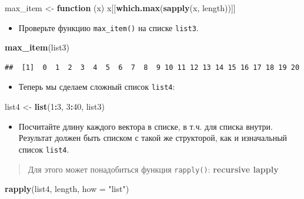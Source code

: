 \documentclass[]{book}
\newenvironment{Shaded}{\begin{snugshade}}{\end{snugshade}}
\newcommand{\KeywordTok}[1]{\textcolor[rgb]{0.13,0.29,0.53}{\textbf{#1}}}
\newcommand{\DataTypeTok}[1]{\textcolor[rgb]{0.13,0.29,0.53}{#1}}
\newcommand{\DecValTok}[1]{\textcolor[rgb]{0.00,0.00,0.81}{#1}}
\newcommand{\StringTok}[1]{\textcolor[rgb]{0.31,0.60,0.02}{#1}}
\newcommand{\ControlFlowTok}[1]{\textcolor[rgb]{0.13,0.29,0.53}{\textbf{#1}}}
\newcommand{\OperatorTok}[1]{\textcolor[rgb]{0.81,0.36,0.00}{\textbf{#1}}}
\newcommand{\NormalTok}[1]{#1}
\providecommand{\tightlist}{%
  \setlength{\itemsep}{0pt}\setlength{\parskip}{0pt}}
\begin{document}
\begin{Shaded}
\begin{Highlighting}[]
\NormalTok{max_item <-}\StringTok{ }\ControlFlowTok{function}\NormalTok{ (x) x[[}\KeywordTok{which.max}\NormalTok{(}\KeywordTok{sapply}\NormalTok{(x, length))]]}
\end{Highlighting}
\end{Shaded}

\begin{itemize}
\tightlist
\item
  Проверьте функцию \texttt{max\_item()} на списке \texttt{list3}.
\end{itemize}

\begin{Shaded}
\begin{Highlighting}[]
\KeywordTok{max_item}\NormalTok{(list3)}
\end{Highlighting}
\end{Shaded}

\begin{verbatim}
##  [1]  0  1  2  3  4  5  6  7  8  9 10 11 12 13 14 15 16 17 18 19 20
\end{verbatim}

\begin{itemize}
\tightlist
\item
  Теперь мы сделаем сложный список \texttt{list4}:
\end{itemize}

\begin{Shaded}
\begin{Highlighting}[]
\NormalTok{list4 <-}\StringTok{ }\KeywordTok{list}\NormalTok{(}\DecValTok{1}\OperatorTok{:}\DecValTok{3}\NormalTok{, }\DecValTok{3}\OperatorTok{:}\DecValTok{40}\NormalTok{, list3)}
\end{Highlighting}
\end{Shaded}

\begin{itemize}
\tightlist
\item
  Посчитайте длину каждого вектора в списке, в т.ч. для списка внутри.
  Результат должен быть списком с такой же структорой, как и изначальный
  список \texttt{list4}.
\end{itemize}

\begin{quote}
Для этого может понадобиться функция \texttt{rapply()}:
\textbf{recursive lapply}
\end{quote}

\begin{Shaded}
\begin{Highlighting}[]
\KeywordTok{rapply}\NormalTok{(list4, length, }\DataTypeTok{how =} \StringTok{"list"}\NormalTok{)}
\end{Highlighting}
\end{Shaded}
\end{document}
